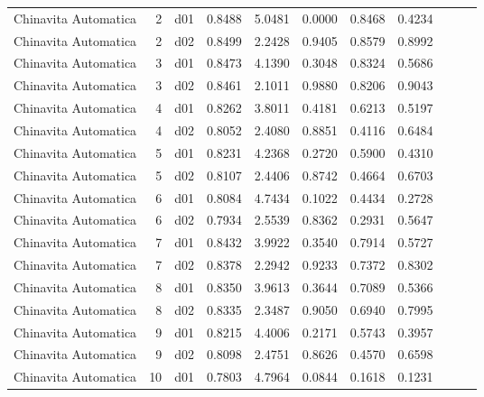 \begin{landscape}
\begin{longtable}{p{2cm}rrrrrrrrrr}
    Chinavita Automatica  &          2 &     d01 &   0.8488 &  5.0481 &        0.0000 &           0.8468 &  0.4234 \\
    Chinavita Automatica  &          2 &     d02 &   0.8499 &  2.2428 &        0.9405 &           0.8579 &  0.8992 \\
    Chinavita Automatica  &          3 &     d01 &   0.8473 &  4.1390 &        0.3048 &           0.8324 &  0.5686 \\
    Chinavita Automatica  &          3 &     d02 &   0.8461 &  2.1011 &        0.9880 &           0.8206 &  0.9043 \\
    Chinavita Automatica  &          4 &     d01 &   0.8262 &  3.8011 &        0.4181 &           0.6213 &  0.5197 \\
    Chinavita Automatica  &          4 &     d02 &   0.8052 &  2.4080 &        0.8851 &           0.4116 &  0.6484 \\
    Chinavita Automatica  &          5 &     d01 &   0.8231 &  4.2368 &        0.2720 &           0.5900 &  0.4310 \\
    Chinavita Automatica  &          5 &     d02 &   0.8107 &  2.4406 &        0.8742 &           0.4664 &  0.6703 \\
    Chinavita Automatica  &          6 &     d01 &   0.8084 &  4.7434 &        0.1022 &           0.4434 &  0.2728 \\
    Chinavita Automatica  &          6 &     d02 &   0.7934 &  2.5539 &        0.8362 &           0.2931 &  0.5647 \\
    Chinavita Automatica  &          7 &     d01 &   0.8432 &  3.9922 &        0.3540 &           0.7914 &  0.5727 \\
    Chinavita Automatica  &          7 &     d02 &   0.8378 &  2.2942 &        0.9233 &           0.7372 &  0.8302 \\
    Chinavita Automatica  &          8 &     d01 &   0.8350 &  3.9613 &        0.3644 &           0.7089 &  0.5366 \\
    Chinavita Automatica  &          8 &     d02 &   0.8335 &  2.3487 &        0.9050 &           0.6940 &  0.7995 \\
    Chinavita Automatica  &          9 &     d01 &   0.8215 &  4.4006 &        0.2171 &           0.5743 &  0.3957 \\
    Chinavita Automatica  &          9 &     d02 &   0.8098 &  2.4751 &        0.8626 &           0.4570 &  0.6598 \\
    Chinavita Automatica  &         10 &     d01 &   0.7803 &  4.7964 &        0.0844 &           0.1618 &  0.1231 \\

\end{longtable}
\end{landscape}
